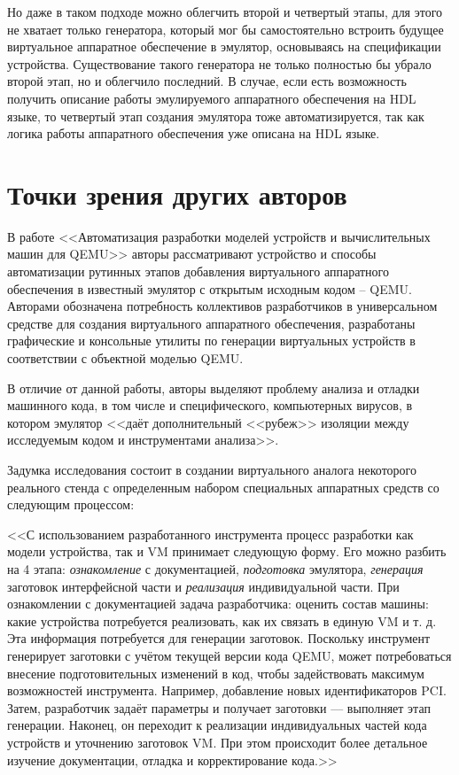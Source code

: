 Но даже в таком подходе можно облегчить второй и четвертый этапы, для этого не хватает только
генератора, который мог бы самостоятельно встроить будущее виртуальное аппаратное обеспечение
в эмулятор, основываясь на спецификации устройства.
Существование такого генератора не только полностью бы убрало второй этап, но и облегчило последний.
В случае, если есть возможность получить описание работы эмулируемого аппаратного обеспечения на HDL языке,
то четвертый этап создания эмулятора тоже автоматизируется, так как логика работы аппаратного обеспечения
уже описана на HDL языке.


\section{Точки зрения других авторов}\label{sec:ch1/sec2}

В работе <<Автоматизация разработки моделей устройств и вычислительных машин для QEMU>> \cite{imposters}
авторы рассматривают устройство и способы автоматизации рутинных этапов добавления виртуального
аппаратного обеспечения в известный эмулятор с открытым исходным кодом -- QEMU.
Авторами обозначена потребность коллективов разработчиков в универсальном средстве
для создания виртуального аппаратного обеспечения,
разработаны графические и консольные утилиты по генерации виртуальных устройств
в соответствии с объектной моделью QEMU.

В отличие от данной работы, авторы выделяют проблему анализа и отладки машинного кода,
в том числе и специфического, компьютерных вирусов, в котором эмулятор <<даёт дополнительный
<<рубеж>> изоляции между исследуемым кодом и инструментами анализа>>.

Задумка исследования \cite{imposters} состоит в создании виртуального аналога некоторого реального стенда
с определенным набором специальных аппаратных средств со следующим процессом:

<<С использованием разработанного инструмента процесс разработки как модели устройства,
так и VM принимает следующую форму.
Его можно разбить на 4 этапа: \textit{ознакомление} с документацией, \textit{подготовка} эмулятора,
\textit{генерация} заготовок интерфейсной части и \textit{реализация} индивидуальной части.
При ознакомлении с документацией задача разработчика: оценить состав
машины: какие устройства потребуется реализовать, как их связать в единую
VM и т. д. Эта информация потребуется для генерации заготовок. Поскольку
инструмент генерирует заготовки с учётом текущей версии кода QEMU,
может потребоваться внесение подготовительных изменений в код, чтобы
задействовать максимум возможностей инструмента. Например, добавление
новых идентификаторов PCI. Затем, разработчик задаёт параметры и получает
заготовки — выполняет этап генерации. Наконец, он переходит к реализации
индивидуальных частей кода устройств и уточнению заготовок VM. При этом
происходит более детальное изучение документации, отладка и
корректирование кода.>>

